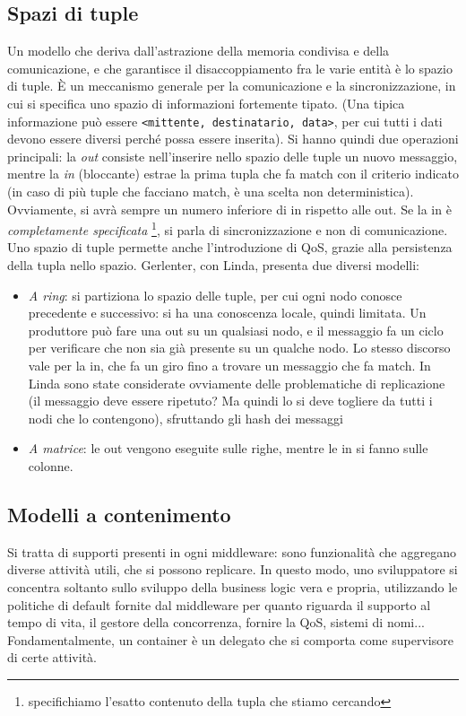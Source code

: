 \subsection{Spazi di tuple}
Un modello che deriva dall'astrazione della memoria condivisa e della comunicazione, e che garantisce il
disaccoppiamento fra le varie entità è lo spazio di tuple. È un meccanismo generale per la comunicazione e la
sincronizzazione, in cui si specifica uno spazio di informazioni fortemente tipato. (Una tipica informazione può essere
\texttt{<mittente, destinatario, data>}, per cui tutti i dati devono essere
diversi perché possa essere inserita).
Si hanno quindi due operazioni principali: la \textit{out} consiste nell'inserire nello spazio delle tuple un nuovo
messaggio, mentre la \textit{in} (bloccante) estrae la prima tupla che fa match
con il criterio indicato (in caso di più tuple che facciano match, è una scelta
non deterministica). Ovviamente, si avrà sempre un numero inferiore di in
rispetto alle out. Se la in è \textit{completamente specificata}
\footnote{specifichiamo l'esatto contenuto della tupla che stiamo cercando}, si
parla di sincronizzazione e non di comunicazione. Uno spazio di tuple permette
anche l'introduzione di QoS, grazie alla persistenza della tupla nello spazio.
Gerlenter, con Linda, presenta due diversi modelli:
\begin{itemize}
 \item \textit{A ring}: si partiziona lo spazio delle tuple, per cui ogni nodo conosce precedente e successivo: si ha
 una conoscenza locale, quindi limitata. Un produttore può fare una out su un qualsiasi nodo, e il messaggio fa un
 ciclo per verificare che non sia già presente su un qualche nodo. Lo stesso discorso vale per la in, che fa un giro
 fino a trovare un messaggio che fa match. In Linda sono state considerate ovviamente delle problematiche di
 replicazione (il messaggio deve essere ripetuto? Ma quindi lo si deve togliere da tutti i nodi che lo contengono),
 sfruttando gli hash dei messaggi
 \item \textit{A matrice}: le out vengono eseguite sulle righe, mentre le in si fanno sulle colonne.
\end{itemize}
\subsection{Modelli a contenimento}
Si tratta di supporti presenti in ogni middleware: sono funzionalità che aggregano diverse attività utili, che si
possono replicare. In questo modo, uno sviluppatore si concentra soltanto sullo sviluppo della business logic vera e
propria, utilizzando le politiche di default fornite dal middleware per quanto riguarda il supporto al tempo di vita,
il gestore della concorrenza, fornire la QoS, sistemi di nomi... Fondamentalmente, un container è un delegato che si
comporta come supervisore di certe attività.
